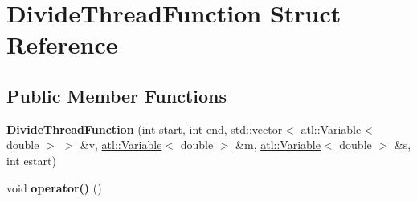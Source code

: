 \hypertarget{struct_divide_thread_function}{\section{Divide\+Thread\+Function Struct Reference}
\label{struct_divide_thread_function}
}
\subsection*{Public Member Functions}
\begin{DoxyCompactItemize}
\item 
\hypertarget{struct_divide_thread_function_a0817b33dc0f8779dbe1fda4089105855}{{\bfseries Divide\+Thread\+Function} (int start, int end, std\+::vector$<$ \hyperlink{structatl_1_1_variable}{atl\+::\+Variable}$<$ double $>$ $>$ \&v, \hyperlink{structatl_1_1_variable}{atl\+::\+Variable}$<$ double $>$ \&m, \hyperlink{structatl_1_1_variable}{atl\+::\+Variable}$<$ double $>$ \&s, int estart)}\label{struct_divide_thread_function_a0817b33dc0f8779dbe1fda4089105855}

\item 
\hypertarget{struct_divide_thread_function_ac17fac6e15cf04baf1508f4fe813ed7a}{void {\bfseries operator()} ()}\label{struct_divide_thread_function_ac17fac6e15cf04baf1508f4fe813ed7a}

\end{DoxyCompactItemize}
